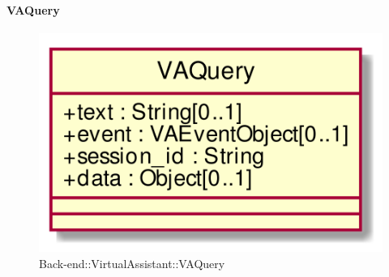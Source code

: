 \hypertarget{VAQuery_label}{\paragraph{VAQuery}}
\begin{figure}[h]
	\centering
	\includegraphics[width=\textwidth,height=\textheight,keepaspectratio]{images/ClassVAQuery.png}
	\caption{Back-end::VirtualAssistant::VAQuery}
\end{figure}
